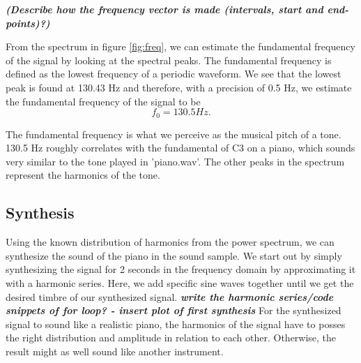 \documentclass[journal]{IEEEtran}
\begin{document}
\textbf{\textit{(Describe how the frequency vector is made (intervals, start and end-points)?)}}

\newline
From the spectrum in figure \ref{fig:freq}, we can estimate the fundamental frequency of the signal by looking at the spectral peaks. The fundamental frequency is defined as the lowest frequency of a periodic waveform. %
We see that the lowest peak is found at 130.43 Hz and therefore, with a precision of 0.5 Hz, we estimate the fundamental frequency of the signal to be
\begin{equation}
    f_0 = 130.5 Hz.
\end{equation}

The fundamental frequency is what we perceive as the musical pitch of a tone. 130.5 Hz roughly correlates with the fundamental of C3 on a piano, which sounds very similar to the tone played in 'piano.wav'. The other peaks in the spectrum represent the harmonics of the tone. 

\subsection{Synthesis}
Using the known distribution of harmonics from the power spectrum, we can synthesize the sound of the piano in the sound sample. We start out by simply synthesizing the signal for 2 seconds in the frequency domain by approximating it with a harmonic series. Here, we add specific sine waves together until we get the desired timbre of our synthesized signal. 
\newline
\textbf{\textit{write the harmonic series/code snippets of for loop? - insert plot of first synthesis}}
\newline
For the synthesized signal to sound like a realistic piano, the harmonics of the signal have to posses the right distribution and amplitude in relation to each other. Otherwise, the result might as well sound like another instrument. 



\end{document}
